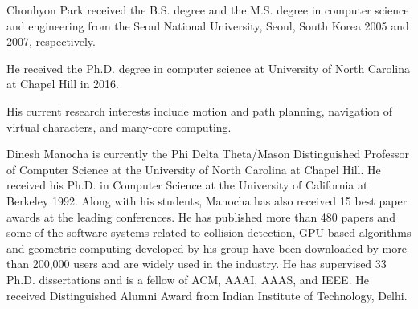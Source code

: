 \documentclass[journal]{IEEEtran}
\begin{document}
\begin{IEEEbiography}{Chonhyon Park}
received the B.S. degree and the M.S. degree in computer science and engineering from the Seoul National University, Seoul, South Korea 2005 and 2007, respectively.

He received the Ph.D. degree in computer science at University of North Carolina at Chapel Hill in 2016.

His current research interests include motion and path planning,  navigation of virtual characters, and many-core computing.
\end{IEEEbiography}

\begin{IEEEbiography}{Dinesh Manocha}
is currently the Phi Delta
Theta/Mason Distinguished Professor of Computer
Science at the University of North Carolina at
Chapel Hill. He received his Ph.D. in Computer
Science at the University of California at Berkeley
1992. Along with his students, Manocha has
also received 15 best paper awards at the leading
conferences. He has published more than 480
papers and some of the software systems related
to collision detection, GPU-based algorithms and
geometric computing developed by his group have
been downloaded by more than 200,000 users and are widely used in the
industry. He has supervised 33 Ph.D. dissertations and is a fellow of ACM, AAAI,
AAAS, and IEEE. He received Distinguished Alumni Award from Indian
Institute of Technology, Delhi.
\end{IEEEbiography}
\end{document}
